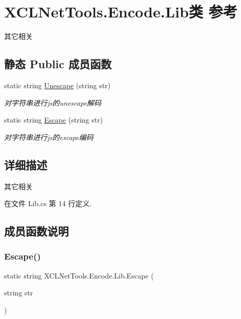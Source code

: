 \hypertarget{class_x_c_l_net_tools_1_1_encode_1_1_lib}{}\section{X\+C\+L\+Net\+Tools.\+Encode.\+Lib类 参考}
\label{class_x_c_l_net_tools_1_1_encode_1_1_lib}


其它相关  


\subsection*{静态 Public 成员函数}
\begin{DoxyCompactItemize}
\item 
static string \hyperlink{class_x_c_l_net_tools_1_1_encode_1_1_lib_a3820bb303f5c96fa7e802f4cd0ac9ece}{Unescape} (string str)
\begin{DoxyCompactList}\small\item\em 对字符串进行js的unescape解码 \end{DoxyCompactList}\item 
static string \hyperlink{class_x_c_l_net_tools_1_1_encode_1_1_lib_aa5d0a56e854bbecc1fcdfea90f393600}{Escape} (string str)
\begin{DoxyCompactList}\small\item\em 对字符串进行js的escape编码 \end{DoxyCompactList}\end{DoxyCompactItemize}


\subsection{详细描述}
其它相关 



在文件 Lib.\+cs 第 14 行定义.



\subsection{成员函数说明}
\mbox{\label{class_x_c_l_net_tools_1_1_encode_1_1_lib_aa5d0a56e854bbecc1fcdfea90f393600}} 
\subsubsection{\texorpdfstring{Escape()}{Escape()}}
{\footnotesize\ttfamily static string X\+C\+L\+Net\+Tools.\+Encode.\+Lib.\+Escape (\begin{DoxyParamCaption}\item[{string}]{str }\end{DoxyParamCaption})\hspace{0.3cm}{\ttfamily [static]}}



